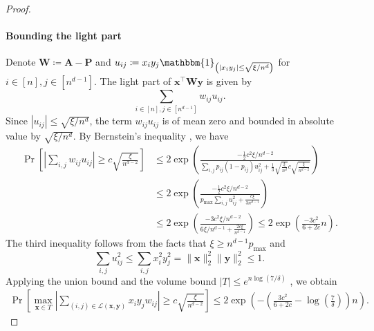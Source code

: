 \documentclass{article}
\theoremstyle{plain}
\theoremstyle{definition}
\theoremstyle{remark}
\newcommand{\BP}{\bm{P}}
\newcommand{\BA}{\bm{A}}
\newcommand{\BW}{\bm{W}}
\def\bx{\bm{x}}
\def\by{\bm{y}}
\begin{document}
\begin{appendix}
\begin{center}
\begin{proof}
			\paragraph{Bounding the light part} Denote $\BW \coloneqq \BA - \BP$ and $u_{i j} \coloneqq x_i y_j \mathbbm{1}_{\left(\left|x_i y_j\right| \leq \sqrt{\xi/n^d} \right)}$ for $i\in[n], j\in[n^{d-1}]$. The light part of $\bx^\top \BW \by$ is given by
			\begin{equation*}
				\sum_{i\in[n],j\in[n^{d-1}]} w_{i j} u_{i j}.
			\end{equation*}
			Since $\left|u_{i j}\right| \leq \sqrt{\xi/n^d}$, the term $w_{ij}u_{ij}$ is of mean zero and bounded in absolute value by $\sqrt{\xi/n^d}$. By Bernstein's inequality \citep[Theorem 2.8.4]{vershynin2018high}, we have
			\begin{align*}
				\operatorname{Pr}\left[\left|\sum_{i,j} w_{i j} u_{i j}\right| \geq c \sqrt{\frac{\xi}{n^{d-2}}}\right] & \leq 2 \exp \left(\frac{-\frac{1}{2} c^2 \xi/n^{d-2}}{\sum_{i,j} p_{i j}\left(1-p_{i j}\right) u_{i j}^2+ \frac{1}{3}\sqrt{\frac{\xi}{n^d}} c \sqrt{\frac{\xi}{n^{d-2}}}}\right) \\
				& \leq 2 \exp \left(\frac{-\frac{1}{2} c^2 \xi/n^{d-2}}{p_{\max } \sum_{i,j} u_{i j}^2+ \frac{c\xi}{3n^{d-1}}}\right) \\
				& \leq 2 \exp \left(\frac{-3 c^2 \xi/n^{d-2}}{6\xi/n^{d-1}+ \frac{2c\xi}{n^{d-1}}}\right)
				\leq 2 \exp \left(\frac{-3c^2}{6+2c}n \right).
			\end{align*}
			The third inequality follows from the facts that $\xi \geq n^{d-1} p_{\max }$ and
			\[
			\sum_{i,j} u_{i j}^2 \leq \sum_{ i, j} x_i^2 y_j^2=\|\bx\|_2^2\|\by\|_2^2 \leq 1 .
			\]
			Applying the union bound and the volume bound $|T| \leq e^{n \log (7 / \delta)}$ \citep{lei2015consistency}, we obtain
			\begin{align}
				\operatorname{Pr}\left[ \max_{\bx \in T} \left|\sum_{ (i,j)\in {\mathcal{L}(\bx, \by) }} x_i y_j w_{ij} \right| \geq c \sqrt{\frac{\xi}{n^{d-2}}}\right] \leq 2 \exp \left( -\left(\frac{3c^2}{6+2c} - \log\left(\frac{7}{\delta}\right) \right)n \right).
			\end{align}

\end{proof}
\end{center}
\end{appendix}
\end{document}
